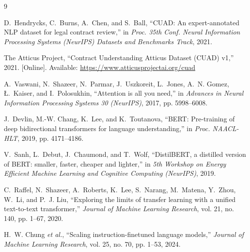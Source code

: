 \documentclass[12pt, a4paper, oneside]{report}
\begin{document}
\clearpage
{}










\begin{thebibliography}{9}

D.~Hendrycks, C.~Burns, A.~Chen, and S.~Ball,
``CUAD: An expert-annotated NLP dataset for legal contract review,''
in \emph{Proc. 35th Conf. Neural Information Processing Systems (NeurIPS) Datasets and Benchmarks Track}, 2021.

The Atticus Project,
``Contract Understanding Atticus Dataset (CUAD) v1,''
2021. [Online]. Available: \url{https://www.atticusprojectai.org/cuad}

A.~Vaswani, N.~Shazeer, N.~Parmar, J.~Uszkoreit, L.~Jones, A.~N. Gomez, {\L}.~Kaiser, and I.~Polosukhin,
``Attention is all you need,''
in \emph{Advances in Neural Information Processing Systems 30 (NeurIPS)}, 2017, pp. 5998--6008.

J.~Devlin, M.-W. Chang, K.~Lee, and K.~Toutanova,
``BERT: Pre-training of deep bidirectional transformers for language understanding,''
in \emph{Proc. NAACL-HLT}, 2019, pp. 4171--4186.

V.~Sanh, L.~Debut, J.~Chaumond, and T.~Wolf,
``DistilBERT, a distilled version of BERT: smaller, faster, cheaper and lighter,''
in \emph{5th Workshop on Energy Efficient Machine Learning and Cognitive Computing (NeurIPS)}, 2019.

C.~Raffel, N.~Shazeer, A.~Roberts, K.~Lee, S.~Narang, M.~Matena, Y.~Zhou, W.~Li, and P.~J. Liu,
``Exploring the limits of transfer learning with a unified text-to-text transformer,''
\emph{Journal of Machine Learning Research}, vol. 21, no. 140, pp. 1--67, 2020.

H.~W. Chung \emph{et al.},
``Scaling instruction-finetuned language models,''
\emph{Journal of Machine Learning Research}, vol. 25, no. 70, pp. 1--53, 2024.


\end{thebibliography}
\end{document}
